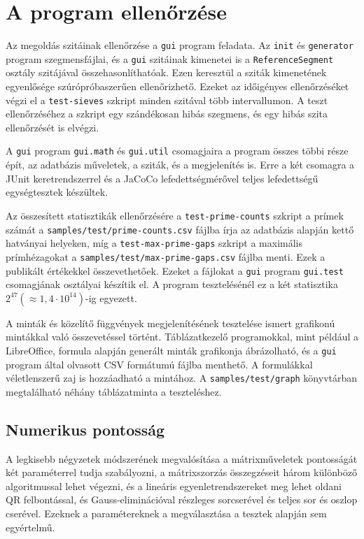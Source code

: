 \pagebreak
\section{A program ellenőrzése}

Az megoldás szitáinak ellenőrzése a \texttt{gui} program feladata.
Az \texttt{init} és \texttt{generator} program szegmensfájlai, és a \texttt{gui} szitáinak kimenetei is a \texttt{ReferenceSegment} osztály szitájával összehasonlíthatóak.
Ezen keresztül a sziták kimenetének egyenlősége szúrópróbaszerűen ellenőrizhető.
Ezeket az időigényes ellenőrzéséket végzi el a \texttt{test-sieves} szkript minden szitával több intervallumon.
A teszt ellenőrzéséhez a szkript egy szándékosan hibás szegmens, és egy hibás szita ellenőrzését is elvégzi.

A \texttt{gui} program \texttt{gui.math} és \texttt{gui.util} csomagjaira a program összes többi része épít, az adatbázis műveletek, a sziták, és a megjelenítés is. Erre a két csomagra a JUnit keretrendszerrel és a JaCoCo lefedettségmérővel teljes lefedettségű egységtesztek készültek.

Az összesített statisztikák ellenőrzésére a \texttt{test-prime-counts} szkript a prímek számát a \texttt{samples/test/prime-counts.csv} fájlba írja az adatbázis alapján kettő hatványai helyeken, míg a \texttt{test-max-prime-gaps} szkript a maximális prímhézagokat a \texttt{samples/test/max-prime-gaps.csv} fájlba menti.
Ezek a publikált értékekkel\cite{gaps}\cite{pi} összevethetőek.
Ezeket a fájlokat a \texttt{gui} program \texttt{gui.test} csomagjának osztályai készítik el.
A program tesztelésénél ez a két statisztika $2^{47}(\approx1,4\cdot10^{14})$-ig egyezett.

A minták és közelítő függvények megjelenítésének tesztelése ismert grafikonú mintákkal való összevetéssel történt.
Táblázatkezelő programokkal, mint például a LibreOffice, formula alapján generált minták grafikonja ábrázolható, és a \texttt{gui} program által olvasott CSV formátumú fájlba menthető.
A formulákkal véletlenszerű zaj is hozzáadható a mintához.
A \texttt{samples/test/graph} könyvtárban megtalálható néhány táblázatminta a teszteléshez.

\subsection{Numerikus pontosság}

A legkisebb négyzetek módszerének megvalósítása a mátrixműveletek pontosságát két paraméterrel tudja szabályozni, a mátrixszorzás összegzéseit három különböző algoritmussal lehet végezni, és a lineáris egyenletrendszereket meg lehet oldani QR felbontással, és Gauss-eliminációval részleges sorcserével és teljes sor és oszlop cserével.
Ezeknek a paramétereknek a megválasztása a tesztek alapján sem egyértelmű.

